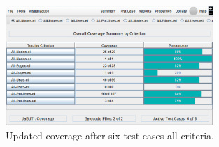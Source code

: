 
\begin{figure}[!ht]
\begin{center}
\includegraphics[width=0.70\textwidth]{fig/report-by-criterion-tc6.eps}
\caption{\label{fig:summary-criterion-tc6} Updated coverage after
six test cases \wrt all criteria.}
\end{center}
\end{figure}

